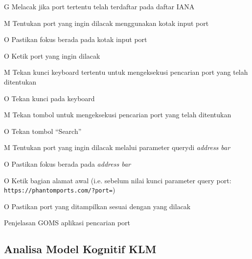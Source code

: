 \begin{gomsfig}
  \begin{gomstbl}
    G{
      Melacak jika port tertentu telah terdaftar pada daftar IANA
    }

    M{
      Tentukan port yang ingin dilacak menggunakan kotak input port
    }

    O{
      Pastikan fokus berada pada kotak input port
    }

    O{
      Ketik port yang ingin dilacak
    }

    M{
      Tekan kunci keyboard tertentu untuk mengeksekusi pencarian port
      yang telah ditentukan
    }

    O{
      Tekan kunci \Enter pada keyboard
    }

    M{
      Tekan tombol untuk mengeksekusi pencarian port yang telah ditentukan
    }

    O{
      Tekan tombol ``Search''
    }

    M{
      Tentukan port yang ingin dilacak melalui parameter
      query\footnotemark di \textit{address bar}\footnotemark
    }

    O{
      Pastikan fokus berada pada \textit{address bar}
    }

    O{
      Ketik bagian alamat awal (i.e. sebelum nilai kunci parameter
      query port: \texttt{https://phantomports.com/?port=})
    }

    O{
      Pastikan port yang ditampilkan sesuai dengan yang dilacak
    }
  \end{gomstbl}
  \caption{Penjelasan GOMS aplikasi pencarian port}
\end{gomsfig}


\subsection{Analisa Model Kognitif KLM}

